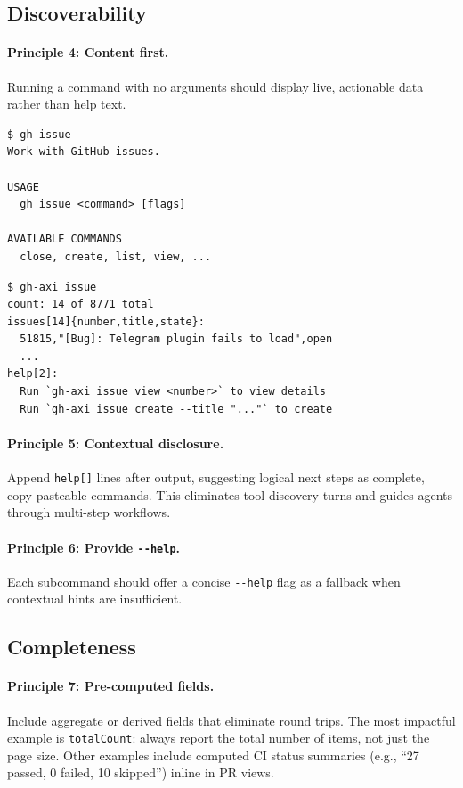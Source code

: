 \documentclass{article}
\begin{document}
\subsection{Discoverability}

\paragraph{Principle 4: Content first.}
Running a command with no arguments should display live, actionable data
rather than help text.

\begin{lstlisting}[caption={Conventional: no-args shows help.}]
$ gh issue
Work with GitHub issues.

USAGE
  gh issue <command> [flags]

AVAILABLE COMMANDS
  close, create, list, view, ...
\end{lstlisting}

\begin{lstlisting}[caption={AXI: no-args shows live state.}]
$ gh-axi issue
count: 14 of 8771 total
issues[14]{number,title,state}:
  51815,"[Bug]: Telegram plugin fails to load",open
  ...
help[2]:
  Run `gh-axi issue view <number>` to view details
  Run `gh-axi issue create --title "..."` to create
\end{lstlisting}

\paragraph{Principle 5: Contextual disclosure.}
Append \texttt{help[]} lines after output, suggesting logical next steps as
complete, copy-pasteable commands. This eliminates tool-discovery turns and
guides agents through multi-step workflows.

\paragraph{Principle 6: Provide \texttt{-{}-help}.}
Each subcommand should offer a concise \texttt{-{}-help} flag as a fallback
when contextual hints are insufficient.

\subsection{Completeness}

\paragraph{Principle 7: Pre-computed fields.}
Include aggregate or derived fields that eliminate round trips. The most
impactful example is \texttt{totalCount}: always report the total number of
items, not just the page size. Other examples include computed CI status
summaries (e.g., ``27 passed, 0 failed, 10 skipped'') inline in PR views.
\end{document}
